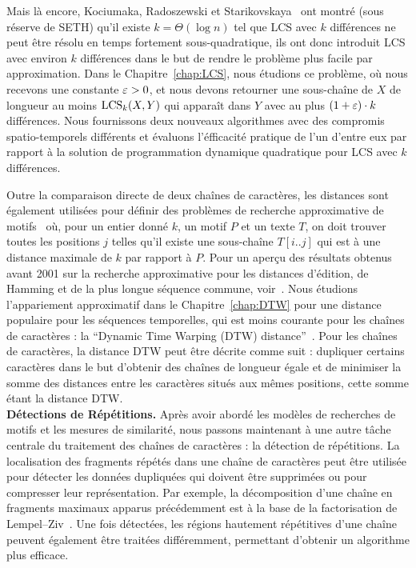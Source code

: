 Mais là encore, Kociumaka, Radoszewski et Starikovskaya~\cite{DBLP:journals/algorithmica/KociumakaRS19} ont montré (sous réserve de SETH) qu'il existe $k=\Theta(\log n)$ tel que LCS avec $k$ différences ne peut être résolu en temps fortement sous-quadratique, ils ont donc introduit LCS avec environ $k$ différences dans le but de rendre le problème plus facile par approximation.
Dans le Chapitre~\ref{chap:LCS}, nous étudions ce problème, où nous recevons une constante $\varepsilon > 0$, et nous devons retourner une sous-chaîne de $X$ de longueur au moins $\mathrm{LCS}_{k}(X,Y)$ qui apparaît dans $Y$ avec au plus $(1+\varepsilon) \cdot k$ différences. Nous fournissons deux nouveaux algorithmes avec des compromis spatio-temporels différents et évaluons l'éfficacité pratique de l'un d'entre eux par rapport à la solution de programmation dynamique quadratique pour LCS avec $k$ différences.


Outre la comparaison directe de deux chaînes de caractères, les distances sont également utilisées pour définir des problèmes de recherche approximative de motifs~\cite{landau1986efficient,landau1989fast} où, pour un entier donné $k$, un motif $P$ et un texte $T$, on doit trouver toutes les positions $j$ telles qu'il existe une sous-chaîne $T[i..j]$ qui est à une distance maximale de $k$ par rapport à $P$.
Pour un aperçu des résultats obtenus avant 2001 sur la recherche approximative pour les distances d'édition, de Hamming et de la plus longue séquence commune, voir~\cite{navarro2001guided}.
Nous étudions l'appariement approximatif dans le Chapitre~\ref{chap:DTW} pour une distance populaire pour les séquences temporelles, qui est moins courante pour les chaînes de caractères : la ``Dynamic Time Warping (DTW) distance''~\cite{sakoe1978dynamic}. Pour les chaînes de caractères, la distance DTW peut être décrite comme suit : dupliquer certains caractères dans le but d'obtenir des chaînes de longueur égale et de minimiser la somme des distances entre les caractères situés aux mêmes positions, cette somme étant la distance DTW. 
\\


\noindent\textbf{Détections de Répétitions.} Après avoir abordé les modèles de recherches de motifs et les mesures de similarité, nous passons maintenant à une autre tâche centrale du traitement des chaînes de caractères : la détection de répétitions. La localisation des fragments répétés dans une chaîne de caractères peut être utilisée pour détecter les données dupliquées qui doivent être supprimées ou pour compresser leur représentation. Par exemple, la décomposition d'une chaîne en fragments maximaux apparus précédemment est à la base de la factorisation de Lempel--Ziv~\cite{ziv1977universal}. Une fois détectées, les régions hautement répétitives d'une chaîne peuvent également être traitées différemment, permettant d'obtenir un algorithme plus efficace.

